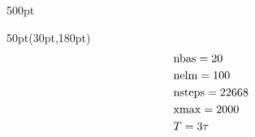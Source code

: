 \begin{frame}
\begin{textblock*}{500pt}
\begin{minipage}{0.0\linewidth}
\end{minipage}
\end{textblock*}


\begin{textblock*}{50pt}(30pt,180pt)
\scriptsize
\begin{align}
& {\rm nbas}   = 20                 \nonumber\\
& {\rm nelm}   = 100                \nonumber\\ 
& {\rm nsteps} = 22668              \nonumber\\ 
& {\rm xmax}   = 2000               \nonumber\\ 
& T = 3\tau                         \nonumber
\end{align}
\end{textblock*}

\end{frame}





